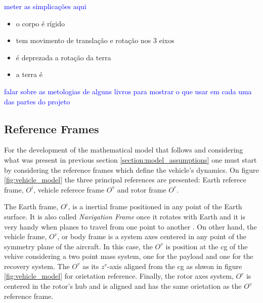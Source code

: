 \textcolor{blue}{meter as simplicações aqui}

\begin{itemize}
    \item o corpo é rígido
    \item tem movimento de translação e rotação nos 3 eixos
    \item é deprezada a rotação da terra
    \item a terra é
\end{itemize}

\textcolor{blue}{falar sobre as metologias de alguns livros para mostrar o que usar em cada uma das partes do projeto}

\subsection{Reference Frames}
\label{section:referece_frames}

For the development of the mathematical model that follows and considering what was present in previous section \ref{section:model_assumptions} one must start by considering the reference frames which define the vehicle's dynamics. On figure \ref{fig:vehicle_model} the three principal references are presented: Earth referece frame, $O^i$, vehicle referece frame $O^v$ and rotor frame $O^r$.

The Earth frame, $O^i$, is a inertial frame positioned in any point of the Earth surface. It is also called \textit{Navigation Frame} once it rotates with Earth and it is very handy when planes to travel from one point to another \cite{soler_fundamentals_2014}. On other hand, the vehicle frame, $O^v$,  or body frame \cite{soler_fundamentals_2014} is a system axes centered in any point of the symmetry plane of the aircraft. In this case, the $O^v$ is position at the \gls{cg} of the vehive considering a two point mass system, one for the payload and one for the recovery system. The $O^v$ as its $z^v$-axis aligned from the \gls{cg} as shwon in figure \ref{fig:vehicle_model} for orietation reference. Finally, the rotor axes system, $O^r$ is centered in the rotor's hub and is aligned and has the same orietation as the $O^v$ reference frame.


